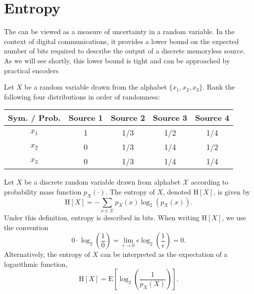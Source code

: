 \section{Entropy}

The  can be viewed as a measure of uncertainty in a random variable.
In the context of digital communications, it provides a lower bound on the expected number of bits required to describe the output of a discrete memoryless source.
As we will see shortly, this lower bound is tight and can be approached by practical encoders

\begin{example}
Let $X$ be a random variable drawn from the alphabet $\{x_1,x_2,x_3\}$.
Rank the following four distributions in order of randomness:

\begin{center}
\begin{tabular}{|c||c|c|c|c|}
\hline
Sym. / Prob. & Source 1 & Source 2 & Source 3 & Source 4 \\
\hline \hline
$x_1$ & 1 & 1/3 & 1/2 & 1/4 \\
\hline
$x_2$ & 0 & 1/3 & 1/4 & 1/2 \\
\hline
$x_3$ & 0 & 1/3 & 1/4 & 1/4 \\
\hline
\end{tabular}
\end{center}
\end{example}

\begin{definition}[Entropy]
Let $X$ be a discrete random variable drawn from alphabet $\mathcal{X}$ according to probability mass function $p_X(\cdot)$.
The entropy of $X$, denoted $\mathrm{H}[X]$, is given by
\begin{equation} \label{equation:Entropy}
\mathrm{H}[X] = - \sum_{x \in \mathcal{X}} p_X (x) \log_2 ( p_X(x) ) .
\end{equation}
Under this definition, entropy is described in bits.
When writing $\mathrm{H}[X]$, we use the convention
\begin{equation*}
0 \cdot \log_2 \left( \frac{1}{0} \right)
= \lim_{\epsilon \rightarrow 0} \epsilon \log_2 \left( \frac{1}{\epsilon} \right)
= 0 .
\end{equation*}
Alternatively, the entropy of $X$ can be interpreted as the expectation of a logarithmic function,
\begin{equation*}
\mathrm{H}[X] = \mathrm{E} \left[ \log_2 \left( \frac{1}{p_X(X)} \right) \right] .
\end{equation*}
\end{definition}


